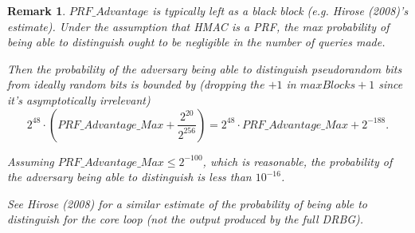 \documentclass[12pt,lot, lof]{puthesis}
\newcommand{\f}{\frac}
\newtheorem{rem}{Remark}[thm]
\begin{document}
{\begin{rem}
$PRF\_Advantage$ is typically left as a black block (e.g. Hirose (2008)'s estimate). Under the assumption that HMAC is a PRF, the max probability of being able to distinguish ought to be negligible in the number of queries made. 

Then the probability of the adversary being able to distinguish pseudorandom bits from ideally random bits is bounded by (dropping the $+1$ in $maxBlocks + 1$ since it's asymptotically irrelevant)
$$2^{48} \cdot (PRF\_Advantage\_Max + \f{2^{20}}{2^{256}}) = 2^{48} \cdot PRF\_Advantage\_Max + 2^{-188}.$$

Assuming $PRF\_Advantage\_Max \leq 2^{-100}$, which is reasonable, the probability of the adversary being able to distinguish is less than $10^{-16}$.

See Hirose (2008) for a similar estimate of the probability of being able to distinguish for the core loop (not the output produced by the full DRBG).

\end{rem}










}
\end{document}
